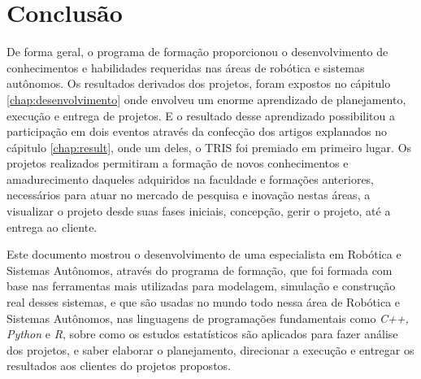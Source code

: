 \chapter{Conclusão}
\label{chap:conc}

De forma geral, o programa de formação proporcionou o desenvolvimento de conhecimentos e habilidades requeridas nas áreas de robótica e sistemas autônomos. Os resultados derivados dos projetos, foram expostos no cápitulo \ref{chap:desenvolvimento} onde envolveu um enorme aprendizado de planejamento, execução e entrega de projetos. E o resultado desse aprendizado possibilitou a participação em dois eventos através da confecção dos artigos explanados no cápitulo \ref{chap:result}, onde um deles, o TRIS foi premiado em primeiro lugar. Os projetos realizados permitiram a formação de novos conhecimentos e amadurecimento daqueles adquiridos na faculdade e formações anteriores, necessários para atuar no mercado de pesquisa e inovação nestas áreas, a visualizar o projeto desde suas fases iniciais, concepção, gerir o projeto, até a entrega ao cliente.

Este documento mostrou o desenvolvimento de uma especialista em Robótica e Sistemas Autônomos, através do programa de formação, que foi formada com base nas ferramentas mais utilizadas para modelagem, simulação e construção real desses sistemas, e que são usadas no mundo todo nessa área de Robótica e Sistemas Autônomos, nas linguagens de programações fundamentais como \textit{C++, Python} e \textit{R}, sobre como os estudos estatísticos são aplicados para fazer análise dos projetos, e saber elaborar o planejamento, direcionar a execução e entregar os resultados aos clientes do projetos propostos. 



